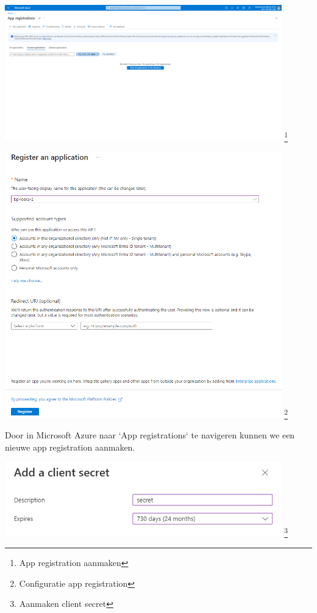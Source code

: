 \begin{center}
    \includegraphics[width=0.9\textwidth]{./graphics/databricks/connection_1.png}
    \footnote{App registration aanmaken}
\end{center}

\begin{center}
    \includegraphics[width=0.9\textwidth]{./graphics/databricks/connection_2.png}
    \footnote{Configuratie app registration}
\end{center}

Door in Microsoft Azure naar `App registrations` te navigeren kunnen we een nieuwe app registration aanmaken.

\begin{center}
    \includegraphics[width=0.9\textwidth]{./graphics/databricks/connection_3.png}
    \footnote{Aanmaken client secret}
\end{center}

